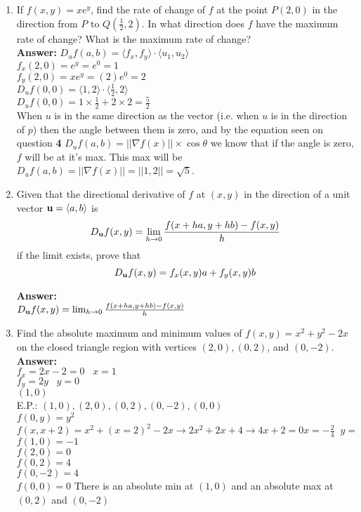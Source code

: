 \documentclass[11pt]{article}
\begin{document}
\begin{enumerate}
   \item If $f(x,y) = xe^y$, find the rate of change of $f$ at the point $P(2,0)$ in the direction from $P$ to $Q(\frac{1}{2}, 2)$.  In what direction does $f$ have the maximum rate of change?  What is the maximum rate of change?
   \\
   \textbf{Answer:}
   $D_uf(a,b)= \langle f_x,f_y \rangle \cdot \langle u_1, u_2 \rangle$
   \\
   $f_x(2,0)=e^y=e^0=1$
   \\
   $f_y(2,0)=xe^y=(2)e^0=2$
   \\
   $D_uf(0,0)=\langle 1,2 \rangle \cdot \langle \frac{1}{2},2 \rangle$
   \\
   $D_uf(0,0)=1 \times \frac{1}{2}+ 2 \times 2= \frac{5}{2} $
   \\
   When $u$ is in the same direction as the vector (i.e. when $u$ is in the direction of $p$) then the angle between them is zero, and by the equation seen on question \textbf{4} $D_uf(a,b)= ||\nabla f(x)|| \times \cos \theta$ we know that if the angle is zero, $f$ will be at it's max. This max will be $D_uf(a,b)= ||\nabla f(x)||=|| 1,2||=\sqrt{5}$.
 
   
   
   
   
   
   
   
   \item Given that the directional derivative of $f$ at $(x, y)$ in the direction of a unit vector ${\bf u} = \langle a, b \rangle$ is 
   \[D_{\bf u} f(x,y) = \lim_{h \to 0} \frac{f(x+ha, y +hb) - f(x, y)}{h} \]
   if the limit exists, prove that
   \[D_{\bf u} f(x,y)  = f_x(x,y) a + f_y(x,y) b \]
   
   \textbf{Answer:}
   \\
   $D_{\bf u} f(x,y) = \lim_{h \to 0} \frac{f(x+ha, y +hb) - f(x, y)}{h}$
   
   
   
   
   
    
    
    
    \item Find the absolute maximum and minimum values of $f(x,y) = x^2 +y^2 - 2x$ on the closed triangle region with vertices $(2,0), (0,2)$, and $(0,-2)$.
    \\
    \textbf{Answer:}
    \\
    $f_x=2x-2=0 \; \; \; x=1$
    \\
    $f_y=2y \; \; \; y=0$
    \\
    $(1,0)$
    \\
    E.P.: $(1,0),(2,0),(0,2),(0,-2),(0,0)$
    \\
    $f(0,y)=y^2$
    \\
    $f(x,x+2)=x^2+(x=2)^2-2x \rightarrow 2x^2+2x+4 \rightarrow 4x+2=0 x=-\frac{2}{4} \; \; y= $
    \\
    $f(1,0)=-1$
    \\
    $f(2,0)=0$
    \\
    $f(0,2)=4$
    \\
    $f(0,-2)=4$
    \\
    $f(0,0)=0$
    There is an absolute min at $(1,0)$ and an absolute max at $(0,2)$ and $(0,-2)$
    

\end{enumerate}
\end{document}
